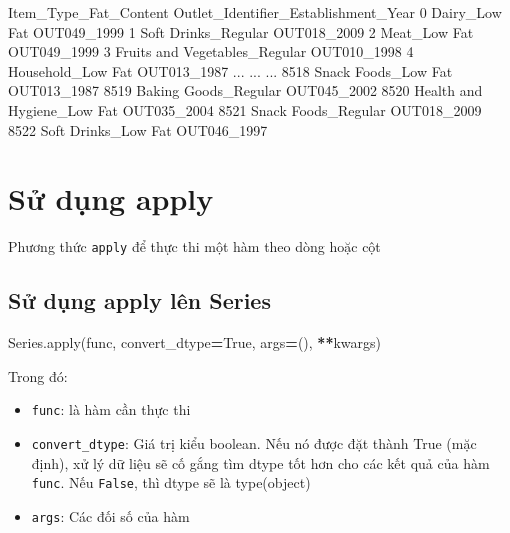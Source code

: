 \documentclass[
]{book}
\newenvironment{Shaded}{\begin{snugshade}}{\end{snugshade}}
\newcommand{\BuiltInTok}[1]{#1}
\newcommand{\NormalTok}[1]{#1}
\newcommand{\OperatorTok}[1]{\textcolor[rgb]{0.81,0.36,0.00}{\textbf{#1}}}
\newcommand{\VariableTok}[1]{\textcolor[rgb]{0.00,0.00,0.00}{#1}}
\begin{document}
\begin{Shaded}
\begin{Highlighting}[]
\NormalTok{              Item\_Type\_Fat\_Content Outlet\_Identifier\_Establishment\_Year}
\NormalTok{0                     Dairy\_Low Fat                          OUT049\_1999}
\NormalTok{1               Soft Drinks\_Regular                          OUT018\_2009}
\NormalTok{2                      Meat\_Low Fat                          OUT049\_1999}
\NormalTok{3     Fruits and Vegetables\_Regular                          OUT010\_1998}
\NormalTok{4                 Household\_Low Fat                          OUT013\_1987}
\NormalTok{...                             ...                                  ...}
\NormalTok{8518            Snack Foods\_Low Fat                          OUT013\_1987}
\NormalTok{8519           Baking Goods\_Regular                          OUT045\_2002}
\NormalTok{8520     Health and Hygiene\_Low Fat                          OUT035\_2004}
\NormalTok{8521            Snack Foods\_Regular                          OUT018\_2009}
\NormalTok{8522            Soft Drinks\_Low Fat                          OUT046\_1997}
\end{Highlighting}
\end{Shaded}

\section{Sử dụng apply}\label{sux1eed-dux1ee5ng-apply}

Phương thức \texttt{apply} để thực thi một hàm theo dòng hoặc cột

\subsection{Sử dụng apply lên Series}\label{sux1eed-dux1ee5ng-apply-luxean-series}

\begin{Shaded}
\begin{Highlighting}[]
\NormalTok{Series.}\BuiltInTok{apply}\NormalTok{(func, convert\_dtype}\OperatorTok{=}\VariableTok{True}\NormalTok{, args}\OperatorTok{=}\NormalTok{(), }\OperatorTok{**}\NormalTok{kwargs)}
\end{Highlighting}
\end{Shaded}

Trong đó:

\begin{itemize}
\item
  \texttt{func}: là hàm cần thực thi
\item
  \texttt{convert\_dtype}: Giá trị kiểu boolean. Nếu nó được đặt thành True (mặc định), xử lý dữ liệu sẽ cố gắng tìm dtype tốt hơn cho các kết quả của hàm \texttt{func}. Nếu \texttt{False}, thì dtype sẽ là type(object)
\item
  \texttt{args}: Các đối số của hàm
\end{itemize}
\end{document}
